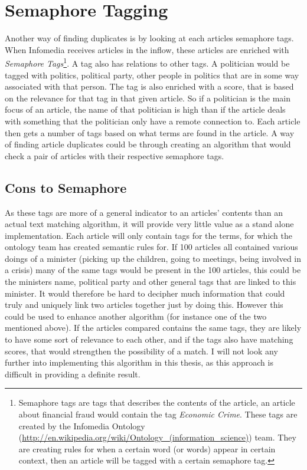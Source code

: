 \section{Semaphore Tagging}
Another way of finding duplicates is by looking at each articles semaphore tags. When Infomedia receives articles in the inflow, these articles are enriched with \textit{Semaphore Tags}\footnote{Semaphore tags are tags that describes the contents of the article, an article about financial fraud would contain the tag \textit{Economic Crime}. These tags are created by the Infomedia Ontology (\url{http://en.wikipedia.org/wiki/Ontology_(information_science)}) team. They are creating rules for when a certain word (or words) appear in certain context, then an article will be tagged with a certain semaphore tag.}. A tag also has relations to other tags. A politician would be tagged with politics, political party, other people in politics that are in some way associated with that person. The tag is also enriched with a score, that is based on the relevance for that tag in that given article. So if a politician is the main focus of an article, the name of that politician is high than if the article deals with something that the politician only have a remote connection to. Each article then gets a number of tags based on what terms are found in the article. A way of finding article duplicates could be through creating an algorithm that would check a pair of articles with their respective semaphore tags.

\subsection{Cons to Semaphore}
As these tags are more of a general indicator to an articles' contents than an actual text matching algorithm, it will provide very little value as a stand alone implementation. Each article will only contain tags for the terms, for which the ontology team has created semantic rules for. If 100 articles all contained various doings of a minister (picking up the children, going to meetings, being involved in a crisis) many of the same tags would be present in the 100 articles, this could be the ministers name, political party and other general tags that are linked to this minister. It would therefore be hard to decipher much information that could truly and uniquely link two articles together just by doing this. However this could be used to enhance another algorithm (for instance one of the two mentioned above). If the articles compared contains the same tags, they are likely to have some sort of relevance to each other, and if the tags also have matching scores, that would strengthen the possibility of a match. I will not look any further into implementing this algorithm in this thesis, as this approach is difficult in providing a definite result.

